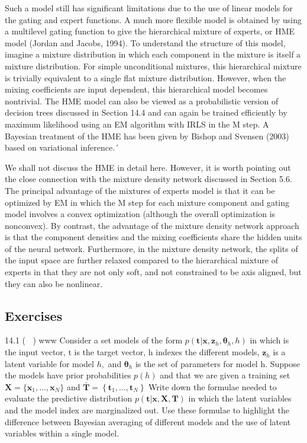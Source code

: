\documentclass[
  10
]{article}
\begin{document}
Such a model still has significant limitations due to the use of linear
models for the gating and expert functions. A much more flexible model
is obtained by using a multilevel gating function to give the
hierarchical mixture of experts, or HME model (Jordan and Jacobs, 1994).
To understand the structure of this model, imagine a mixture
distribution in which each component in the mixture is itself a mixture
distribution. For simple unconditional mixtures, this hierarchical
mixture is trivially equivalent to a single flat mixture distribution.
However, when the mixing coefficients are input dependent, this
hierarchical model becomes nontrivial. The HME model can also be viewed
as a probabilistic version of decision trees discussed in Section 14.4
and can again be trained efficiently by maximum likelihood using an EM
algorithm with IRLS in the M step. A Bayesian treatment of the HME has
been given by Bishop and Svensen (2003) based on variational inference.´

We shall not discuss the HME in detail here. However, it is worth
pointing out the close connection with the mixture density network
discussed in Section 5.6. The principal advantage of the mixtures of
experts model is that it can be optimized by EM in which the M step for
each mixture component and gating model involves a convex optimization
(although the overall optimization is nonconvex). By contrast, the
advantage of the mixture density network approach is that the component
densities and the mixing coefficients share the hidden units of the
neural network. Furthermore, in the mixture density network, the splits
of the input space are further relaxed compared to the hierarchical
mixture of experts in that they are not only soft, and not constrained
to be axis aligned, but they can also be nonlinear.

\subsection{Exercises}\label{exercises-3}

14.1 ( ) www Consider a set models of the form
\(p ( \mathbf { t } | \mathbf { x } , \mathbf { z } _ { h } , \pmb { \theta } _ { h } , h )\)
in which is the input vector, t is the target vector, h indexes the
different models, \(\mathbf { z } _ { h }\) is a latent variable for
model \(h ,\) and \(\pmb { \theta } _ { h }\) is the set of parameters
for model h. Suppose the models have prior probabilities \(p ( h )\) and
that we are given a training set
\(\mathbf { X } = \{ \mathbf { x } _ { 1 } , \ldots , \mathbf { x } _ { N } \}\)
and
\(\bar { \mathbf { T } } = \left\{ \mathbf { t } _ { 1 } , \ldots , \mathbf { t } _ { N } \right\}\)
Write down the formulae needed to evaluate the predictive distribution
\(p ( \mathbf { t } | \mathbf { x } , \mathbf { X } , \mathbf { T } )\)
in which the latent variables and the model index are marginalized out.
Use these formulae to highlight the difference between Bayesian
averaging of different models and the use of latent variables within a
single model.
\end{document}
